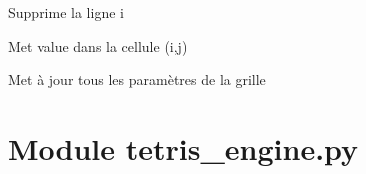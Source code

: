 \documentclass[letterpaper,10pt,french]{sphinxmanual}
\begin{document}
\begin{fulllineitems}
\begin{fulllineitems}
\end{fulllineitems}


\begin{fulllineitems}
\label{\detokenize{index:board.Board.removeLine}}
Supprime la ligne i

\end{fulllineitems}


\begin{fulllineitems}
\label{\detokenize{index:board.Board.setCell}}
Met value dans la cellule (i,j)

\end{fulllineitems}


\begin{fulllineitems}
\label{\detokenize{index:board.Board.updateStats}}
Met à jour tous les paramètres de la grille

\end{fulllineitems}


\end{fulllineitems}



\section{Module tetris\_engine.py}
\label{\detokenize{index:module-tetris-engine-py}}\label{\detokenize{index:module-tetris_engine}}
\end{document}

